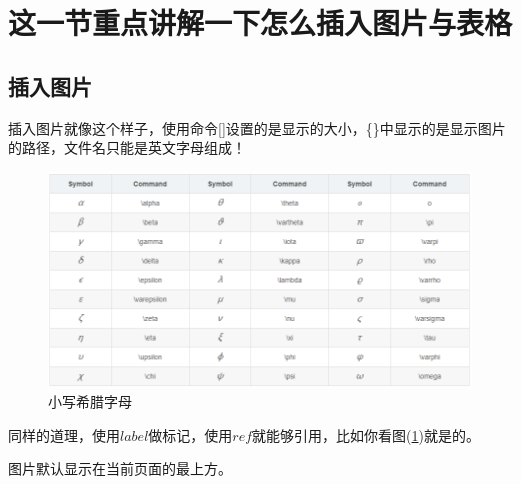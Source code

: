 \documentclass[../docment.tex]{subfiles}
\begin{document}
	\section{这一节重点讲解一下怎么插入图片与表格}
	\subsection{插入图片}
	插入图片就像这个样子，使用命令[]设置的是显示的大小，\{\}中显示的是显示图片的路径，{\heiti 文件名只能是英文字母组成！}
	\begin{figure}
		\centering
		\includegraphics[width=0.50\textheight]{image/image.png}
		\caption{小写希腊字母}
		\label{image:小写希腊字母}
	\end{figure}

	同样的道理，使用$label$做标记，使用$ref$就能够引用，比如你看图(\ref{image:小写希腊字母})就是的。
	
	图片默认显示在当前页面的最上方。
\end{document}
